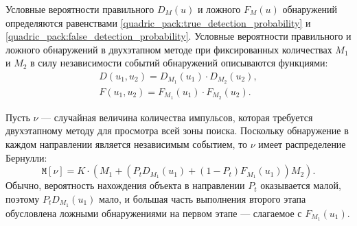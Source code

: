\documentclass[a4paper,12pt]{article}
\newcommand{\expectation}[1]{\mathtt{M} \left [ #1 \right ]}
\begin{document}
    Условные вероятности правильного $D_M(u)$ и ложного $F_M(u)$ обнаружений определяются равенствами \eqref{quadric_pack:true_detection_probability} и
    \eqref{quadric_pack:false_detection_probability}. Условные вероятности правильного и ложного обнаружений в двухэтапном методе при фиксированных количествах
    $M_1$ и $M_2$ в силу независимости событий обнаружений описываются функциями:
    \begin{equation}
        \label{equation:two_stage_detection:probabilities}
        \begin{array}{c}
            D(u_1, u_2) = D_{M_1}(u_1) \cdot D_{M_2}(u_2) , \\
            F(u_1, u_2) = F_{M_1}(u_1) \cdot F_{M_2}(u_2) .
        \end{array}
    \end{equation}

    Пусть $\nu$ --- случайная величина количества импульсов, которая требуется двухэтапному методу для просмотра всей зоны поиска. Поскольку обнаружение в каждом направлении
    является независимым событием, то $\nu$ имеет распределение Бернулли:
    \[
        \expectation{\nu}
        = K \cdot \left ( M_1 + \left ( P_t D_{M_1}(u_1) + \left ( 1 - P_t \right ) F_{M_1}(u_1) \right ) M_2 \right ) .
    \]
    Обычно, вероятность нахождения объекта в направлении $P_t$ оказывается малой, поэтому $P_t D_{M_1}(u_1)$ мало, и большая часть выполнения второго этапа обусловлена
    ложными обнаружениями на первом этапе --- слагаемое с $F_{M_1}(u_1)$.
\end{document}
